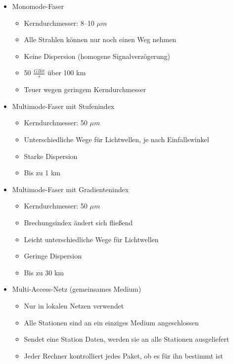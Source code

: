 \begin{itemize}
    \item Monomode-Faser
    \begin{itemize}
        \item Kerndurchmesser: 8--10 $\mu m$
        \item Alle Strahlen können nur noch einen Weg nehmen
        \item Keine Dispersion (homogene Signalverzögerung)
        \item 50 $\frac{GBit}{s}$ über 100 km
        \item Teuer wegen geringem Kerndurchmesser
    \end{itemize}
    \item Multimode-Faser mit Stufenindex
    \begin{itemize}
        \item Kerndurchmesser: 50 $\mu m$
        \item Unterschiedliche Wege für Lichtwellen, je nach Einfallswinkel
        \item Starke Dispersion
        \item Bis zu 1 km
    \end{itemize}
    \item Multimode-Faser mit Gradientenindex
    \begin{itemize}
        \item Kerndurchmesser: 50 $\mu m$
        \item Brechungsindex ändert sich fließend
        \item Leicht unterschiedliche Wege für Lichtwellen
        \item Geringe Dispersion
        \item Bis zu 30 km
    \end{itemize}
\end{itemize}

\begin{itemize}
    \item Multi-Access-Netz (gemeinsames Medium)
    \begin{itemize}
        \item Nur in lokalen Netzen verwendet
        \item Alle Stationen sind an ein einziges Medium angeschlossen
        \item Sendet eine Station Daten, werden sie an alle Stationen ausgeliefert
        \item Jeder Rechner kontrolliert jedes Paket, ob es für ihn bestimmt ist
    \end{itemize}
\end{itemize}

